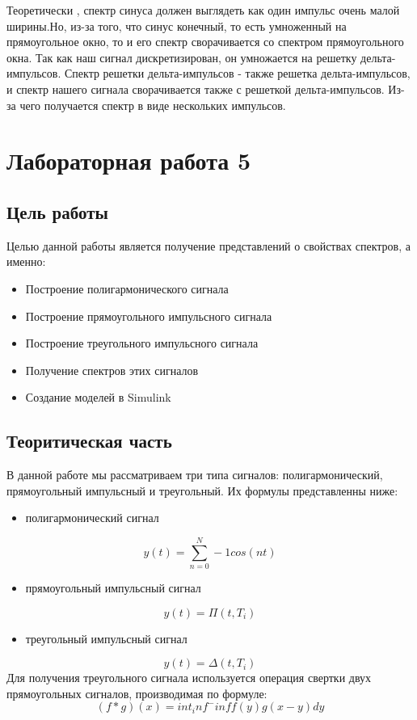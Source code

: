 \documentclass[10pt,a4paper]{report}
\begin{document}
Теоретически , спектр синуса должен выглядеть как один импульс очень малой ширины.Но, из-за того, что синус конечный, то есть умноженный на прямоугольное окно, то и его спектр сворачивается со спектром прямоугольного окна. Так как наш сигнал дискретизирован, он умножается на решетку дельта-импульсов. Спектр решетки дельта-импульсов - также решетка дельта-импульсов, и спектр нашего сигнала сворачивается также с решеткой дельта-импульсов. Из-за чего получается спектр в виде нескольких импульсов.
\chapter{Лабораторная работа 5}
\section{Цель работы}
Целью данной работы является получение представлений о свойствах спектров, а именно:
\begin{itemize}
\item Построение полигармонического сигнала
\item Построение прямоугольного импульсного сигнала
\item Построение треугольного импульсного сигнала
\item Получение спектров этих сигналов
\item Создание моделей в Simulink
\end{itemize}
\section{Теоритическая часть}
В данной работе мы рассматриваем три типа сигналов: полигармонический, прямоугольный импульсный и треугольный. Их формулы представленны ниже:
\begin{itemize}
\item полигармонический сигнал 
\end{itemize}
\begin{displaymath}
y(t) = \sum_{n=0}^N-1 cos(nt)
\end{displaymath}
\begin{itemize}
\item прямоугольный импульсный сигнал
\end{itemize}
\begin{displaymath}
y(t) = \Pi (t,T_i)
\end{displaymath}
\begin{itemize}
\item треугольный импульсный сигнал
\end{itemize}
\begin{displaymath}
y(t) = \Delta (t,T_i)
\end{displaymath}
Для получения треугольного сигнала используется операция свертки двух прямоугольных сигналов, производимая по формуле:
\begin{displaymath}
(f*g)(x) = int_inf^-inf f(y)g(x-y)dy
\end{displaymath}
\end{document}
